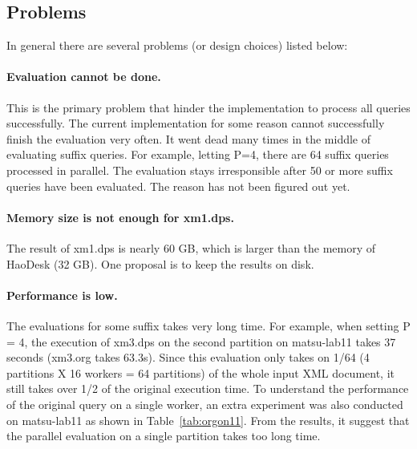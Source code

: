 


\subsection{Problems}

In general there are several problems (or design choices) listed below:

\paragraph{Evaluation cannot be done.}

This is the primary problem that hinder the implementation to process
all queries successfully.
The current implementation for some reason cannot successfully finish
the evaluation very often. It went dead many times in the middle of
evaluating suffix queries. For example, letting P=4, there are 64 suffix
queries processed in parallel. The evaluation stays irresponsible after
50 or more suffix queries have been evaluated. The reason has not been
figured out yet.

\paragraph{Memory size is not enough for xm1.dps.}
The result of xm1.dps is nearly 60 GB, which is larger than the memory
of HaoDesk (32 GB). One proposal is to keep the results on disk.


\paragraph{Performance is low.}

The evaluations for some suffix takes very long time.
For example, when setting P = 4, the execution of xm3.dps on the second partition
on matsu-lab11 takes 37 seconds (xm3.org takes 63.3s). Since this evaluation only 
takes on 1/64 (4 partitions X 16 workers = 64 partitions) of the whole 
input XML document, it still takes over 1/2 of the original execution time.
To understand the performance of the original query on a single worker, 
an extra  experiment was also conducted on matsu-lab11 as shown in Table~\ref{tab:orgon11}.
From the results, it suggest that the parallel evaluation on a single partition
takes too long time. 

